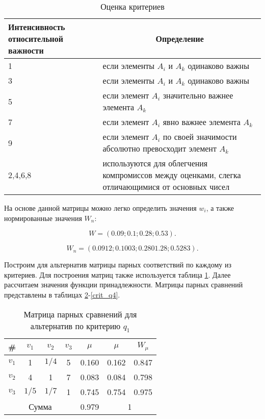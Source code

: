 \begin{table}[H]
  \caption{Оценка критериев}\label{crit_scale}
  \begin{tabular}{|p{4cm}|p{12cm}|}
  \hline Интенсивность относительной важности & \multicolumn{1}{|c|}{Определение} \\
  \hline 1 & если элементы $A_i$ и $A_k$ одинаково важны \\
  \hline 3 & если элементы $A_i$ и $A_k$ одинаково важны \\
  \hline 5 & если элемент $A_i$ значительно важнее элемента $A_k$ \\
  \hline 7 & если элемент $A_i$ явно важнее элемента $A_k$ \\
  \hline 9 & если элемент $A_i$ по своей значимости абсолютно превосходит элемент $A_k$ \\
  \hline 2,4,6,8 & используются для облегчения компромиссов между оценками, слегка отличающимися от основных чисел \\
  \hline
  \end{tabular}
\end{table}

На основе данной матрицы можно легко определить значения $w_i$, а также нормированные значения $W_n$:

\begin{equation}
    W=(0.09;0.1;0.28;0.53).
\end{equation}

\begin{equation}
    W_n=(0.0912;0.1003;0.2801.28;0.5283).
\end{equation}

Построим для альтернатив матрицы парных соответствий по каждому из критериев. 
Для построения матриц также используется таблица \ref{crit_scale}. 
Далее рассчитаем значения функции принадлежности.
Матрицы парных сравнений представлены в таблицах \ref{crit_q1}-\ref{crit_q4}.

\begin{table}[H]
    \centering
    \caption{Матрица парных сравнений для альтернатив по критерию $q_1$}\label{crit_q1}
    \begin{tabular}{|c|c|c|c|c|c|c|}
    \hline \# & $v_1$ & $v_2$ & $v_3$ & $\mu$ & $\mu$ & $W_{\mu}$ \\
    \hline $v_1$ & 1 & $1/4$ & 5 & 0.160 & 0.162 & 0.847 \\
    \hline $v_2$ & 4 & 1 & 7 &  0.083 & 0.084 & 0.798\\
    \hline $v_3$ & $1/5$ & $1/7$ & 1 & 0.745 & 0.754 & 0.975 \\
    \hline \multicolumn{4}{|c|}{Сумма} & 0.979 & \multicolumn{2}{|c|}{1} \\
    \hline
    \end{tabular}
\end{table}

